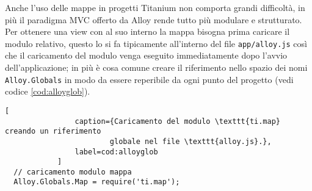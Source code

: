             Anche l'uso delle mappe in progetti Titanium
            non comporta grandi difficoltà, in più il paradigma MVC
            offerto da Alloy rende tutto più modulare e strutturato. Per ottenere
            una view con al suo interno la mappa bisogna prima caricare il modulo
            relativo, questo lo si fa tipicamente all'interno del file
            \texttt{app/alloy.js} così che il caricamento del modulo venga
            eseguito immediatamente dopo l'avvio dell'applicazione; in più è cosa
            comune creare il riferimento nello spazio dei nomi \texttt{Alloy.Globals}
            in modo da essere reperibile da ogni punto del progetto (vedi codice \ref{cod:alloyglob}).
            \begin{lstlisting}[
                caption={Caricamento del modulo \texttt{ti.map} creando un riferimento
                        globale nel file \texttt{alloy.js}.},
                label=cod:alloyglob
            ]
  // caricamento modulo mappa
  Alloy.Globals.Map = require('ti.map');
            \end{lstlisting}
            
